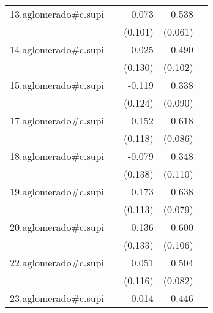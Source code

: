 {\begin{longtable}{l*{4}{D{.}{.}{-1}}}
\addlinespace
13.aglomerado#c.supi&                     &       0.073         &       0.538\sym{***}&                     \\
            &                     &     (0.101)         &     (0.061)         &                     \\
\addlinespace
14.aglomerado#c.supi&                     &       0.025         &       0.490\sym{***}&                     \\
            &                     &     (0.130)         &     (0.102)         &                     \\
\addlinespace
15.aglomerado#c.supi&                     &      -0.119         &       0.338\sym{***}&                     \\
            &                     &     (0.124)         &     (0.090)         &                     \\
\addlinespace
17.aglomerado#c.supi&                     &       0.152         &       0.618\sym{***}&                     \\
            &                     &     (0.118)         &     (0.086)         &                     \\
\addlinespace
18.aglomerado#c.supi&                     &      -0.079         &       0.348\sym{**} &                     \\
            &                     &     (0.138)         &     (0.110)         &                     \\
\addlinespace
19.aglomerado#c.supi&                     &       0.173         &       0.638\sym{***}&                     \\
            &                     &     (0.113)         &     (0.079)         &                     \\
\addlinespace
20.aglomerado#c.supi&                     &       0.136         &       0.600\sym{***}&                     \\
            &                     &     (0.133)         &     (0.106)         &                     \\
\addlinespace
22.aglomerado#c.supi&                     &       0.051         &       0.504\sym{***}&                     \\
            &                     &     (0.116)         &     (0.082)         &                     \\
\addlinespace
23.aglomerado#c.supi&                     &       0.014         &       0.446\sym{***}&                     \\

\end{longtable}}
